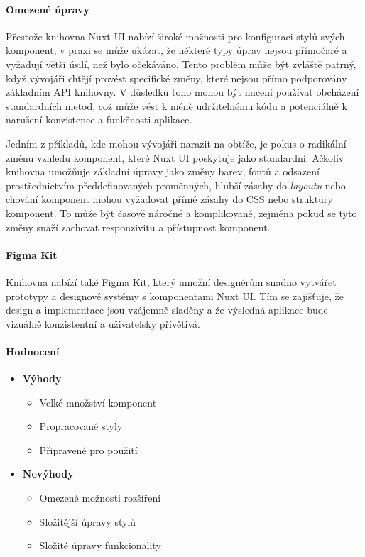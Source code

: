 \paragraph{Omezené úpravy}
Přestože knihovna Nuxt UI nabízí široké možnosti pro konfiguraci stylů svých komponent, v praxi se může ukázat, že některé typy úprav nejsou přímočaré a vyžadují větší úsilí, než bylo očekáváno. Tento problém může být zvláště patrný, když vývojáři chtějí provést specifické změny, které nejsou přímo podporovány základním API knihovny. V důsledku toho mohou být nuceni používat obcházení standardních metod, což může vést k méně udržitelnému kódu a potenciálně k narušení konzistence a funkčnosti aplikace.

Jedním z příkladů, kde mohou vývojáři narazit na obtíže, je pokus o radikální změnu vzhledu komponent, které Nuxt UI poskytuje jako standardní. Ačkoliv knihovna umožňuje základní úpravy jako změny barev, fontů a odsazení prostřednictvím předdefinovaných proměnných, hlubší zásahy do \emph{layoutu} nebo chování komponent mohou vyžadovat přímé zásahy do CSS nebo struktury komponent. To může být časově náročné a komplikované, zejména pokud se tyto změny snaží zachovat responzivitu a přístupnost komponent.

\paragraph{Figma Kit}

Knihovna nabízí také Figma Kit, který umožní designérům snadno vytvářet prototypy a designové systémy s komponentami Nuxt UI. Tím se zajišťuje, že design a implementace jsou vzájemně sladěny a že výsledná aplikace bude vizuálně konzistentní a uživatelsky přívětivá. \cite{NuxtUIFigma}

\paragraph{Hodnocení}

\begin{itemize}
    \item \textbf{Výhody}
    \begin{itemize}
        \item Velké množství komponent
        \item Propracované styly
        \item Připravené pro použití
    \end{itemize}
    \item \textbf{Nevýhody}
    \begin{itemize}
        \item Omezené možnosti rozšíření
        \item Složitější úpravy stylů
        \item Složité úpravy funkcionality
    \end{itemize}
\end{itemize}

